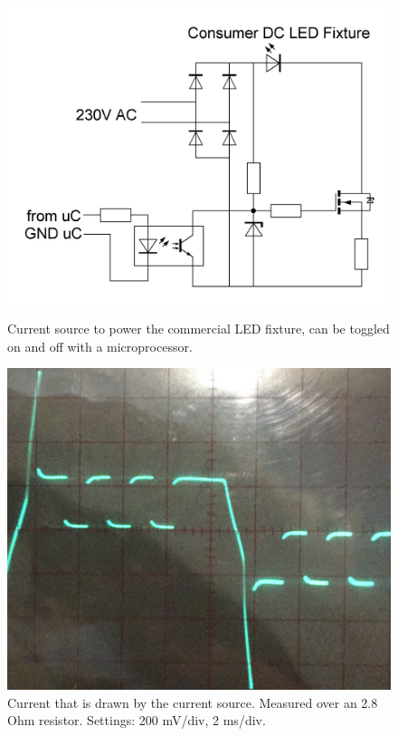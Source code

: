 	\begin{figure}[!tbp]
	  \centering
	  \begin{minipage}[b]{0.49\textwidth}
	    \includegraphics[width=\textwidth]{chapters/hardware-chapters/custom-modulator-current-source.JPG}
		\caption{Current source to power the commercial LED fixture, can be toggled on and off with a microprocessor.}
		\label{fig:custom-modulator-current-source}
	  \end{minipage}
	  \hfill
	  \begin{minipage}[b]{0.49\textwidth}
	    \includegraphics[width=\textwidth]{chapters/hardware-chapters/current-source-measurement-cropped.png}
	    \caption{Current that is drawn by the current source. Measured over an 2.8 Ohm resistor. Settings: 200 mV/div, 2 ms/div.}
		\label{fig:current-source-measurement}
	  \end{minipage}
	\end{figure}


